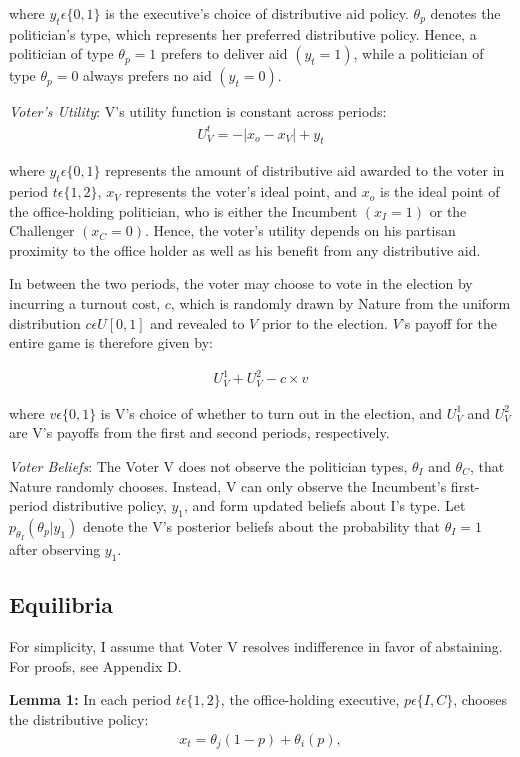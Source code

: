 \documentclass[12pt]{paper}
\begin{document}
where $y_t\epsilon \{0,1\}$ is the executive’s choice of distributive aid policy. $\theta_p$ denotes the politician’s type, which represents her preferred distributive policy. Hence, a politician of type $\theta_p = 1$ prefers to deliver aid $(y_t = 1)$, while a politician of type $\theta_p = 0$ always prefers no aid $(y_t = 0).$

\emph{Voter's Utility}: V’s utility function is constant across periods: 
\begin{gather}
U_{V}^t = -|x_o - x_V| + y_t
\end{gather}

where $y_t \epsilon \{0,1\}$ represents the amount of distributive aid awarded to the voter in period $t \epsilon \{1,2\}$, $x_V$ represents the voter’s ideal point, and $x_o$ is the ideal point of the office-holding politician, who is either the Incumbent $(x_I = 1)$ or the Challenger $(x_C = 0).$ Hence, the voter’s utility depends on his partisan proximity to the office holder as well as his benefit from any distributive aid.

In between the two periods, the voter may choose to vote in the election by incurring a turnout cost, $c$, which is randomly drawn by Nature from the uniform distribution $c \epsilon U[0,1]$ and revealed to $V$ prior to the election. $V$’s payoff for the entire game is therefore given by:

\begin{gather}
U_{V}^1 + U_{V}^2 - c \times v
\end{gather}

where $v \epsilon \{0,1\}$ is V’s choice of whether to turn out in the election, and $U_{V}^1$ and $U_{V}^2$ are V’s payoffs from the first and second periods, respectively.

\emph{Voter Beliefs}: The Voter V does not observe the politician types, $\theta_I$ and $\theta_C$, that Nature randomly chooses. Instead, V can only observe the Incumbent's first-period distributive policy,  $y_1$, and form updated beliefs about I’s type. Let $p_{\theta_I} (\theta_p | y_1 )$ denote the V’s posterior beliefs about the probability that $\theta_I = 1$ after observing $y_1$.

\subsection{Equilibria}
For simplicity, I assume that Voter V resolves indifference in favor of abstaining. For proofs, see Appendix D.
	
\textbf{Lemma 1:} In each period $t \epsilon \{1,2\}$, the office-holding executive, $p \epsilon \{I,C\}$, chooses the distributive policy: 
\begin{gather}
x_t=\theta_j (1-p)+ \theta_i (p), 
\end{gather}
\end{document}
